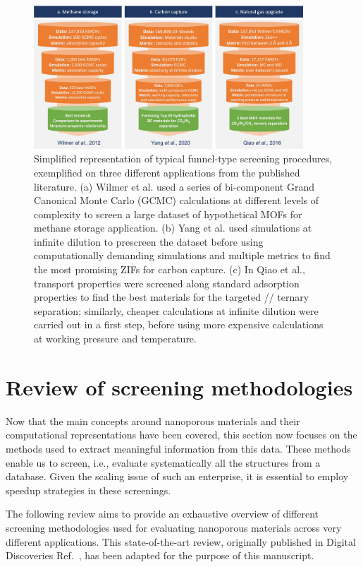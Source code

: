 \documentclass[main.tex]{subfiles}
\begin{document}
\begin{figure}[t]
  \centering
    \includegraphics[width=0.9\textwidth]{figures/1-screening/Screening_procedures.jpg}
    \caption{Simplified representation of typical funnel-type screening procedures, exemplified on three different applications from the published literature. (a) Wilmer et al.\autocite{Wilmer_2012} used a series of bi-component Grand Canonical Monte Carlo (GCMC) calculations at different levels of complexity to screen a large dataset of hypothetical MOFs for methane storage application. (b) Yang et al.\autocite{Yang_2020} used simulations at infinite dilution to prescreen the dataset before using computationally demanding simulations and multiple metrics to find the most promising ZIFs for carbon capture. (c) In Qiao et al.\autocite{Qiao_2016}, transport properties were screened along standard adsorption properties to find the best materials for the targeted // ternary separation; similarly, cheaper calculations at infinite dilution were carried out in a first step, before using more expensive calculations at working pressure and temperature.}\label{fgr:screening}
\end{figure}


\section{Review of screening methodologies}

Now that the main concepts around nanoporous materials and their computational representations have been covered, this section now focuses on the methods used to extract meaningful information from this data. These methods enable us to screen, i.e., evaluate systematically all the structures from a database. Given the scaling issue of such an enterprise, it is essential to employ speedup strategies in these screenings. 

The following review aims to provide an exhaustive overview of different screening methodologies used for evaluating nanoporous materials across very different applications. This state-of-the-art review, originally published in Digital Discoveries Ref.~\cite{Ren_2022}, has been adapted for the purpose of this manuscript.
\end{document}
